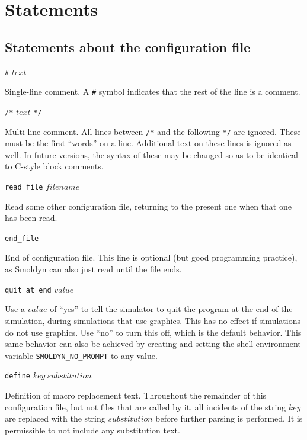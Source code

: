 \documentclass {scrbook}
\newcommand {\ttt} {\texttt}
\begin{document}
\chapter{Statements}

\section{Statements about the configuration file}

\begin{description}

\item{\ttt{\#} $text$}

Single-line comment. A \ttt{\#} symbol indicates that the rest of the line is a comment.

\item{\ttt{/*} $text$ \ttt{*/}}

Multi-line comment. All lines between \ttt{/*} and the following \ttt{*/} are ignored. These must be the first ``words'' on a line. Additional text on these lines is ignored as well. In future versions, the syntax of these may be changed so as to be identical to C-style block comments.

\item{\ttt{read\_file} $filename$}

Read some other configuration file, returning to the present one when that one has been read.

\item{\ttt{end\_file}}

End of configuration file. This line is optional (but good programming practice), as Smoldyn can also just read until the file ends.

\item{\ttt{quit\_at\_end} $value$}

Use a $value$ of ``yes'' to tell the simulator to quit the program at the end of the simulation, during simulations that use graphics. This has no effect if simulations do not use graphics. Use ``no'' to turn this off, which is the default behavior. This same behavior can also be achieved by creating and setting the shell environment variable \ttt{SMOLDYN\_NO\_PROMPT} to any value.

\item{\ttt{define} $key\ substitution$}

Definition of macro replacement text. Throughout the remainder of this configuration file, but not files that are called by it, all incidents of the string $key$ are replaced with the string $substitution$ before further parsing is performed. It is permissible to not include any substitution text.


\end{description}
\end{document}
